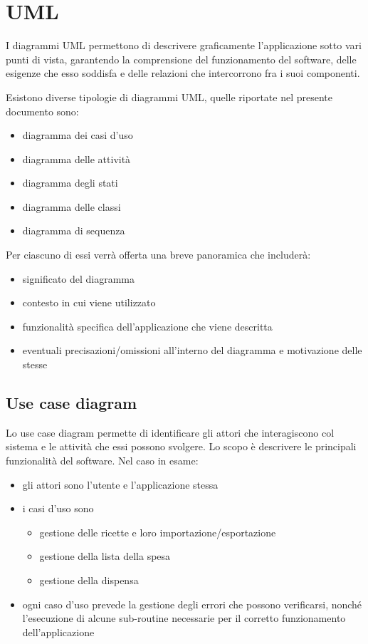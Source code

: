 \chapter{UML}

I diagrammi UML permettono di descrivere graficamente l'applicazione sotto vari punti di vista, garantendo la comprensione del funzionamento del software, delle esigenze che esso soddisfa e delle relazioni che intercorrono fra i suoi componenti.

Esistono diverse tipologie di diagrammi UML, quelle riportate nel presente documento sono:
\begin{itemize}
    \item diagramma dei casi d'uso
    \item diagramma delle attività
    \item diagramma degli stati
    \item diagramma delle classi
    \item diagramma di sequenza
\end{itemize}

Per ciascuno di essi verrà offerta una breve panoramica che includerà:
\begin{itemize}
    \item significato del diagramma 
    \item contesto in cui viene utilizzato
    \item funzionalità specifica dell'applicazione che viene descritta
    \item eventuali precisazioni/omissioni all'interno del diagramma e motivazione delle stesse
\end{itemize}

\newpage

\section{Use case diagram}

Lo use case diagram permette di identificare gli attori che interagiscono col sistema e le attività che essi possono svolgere. Lo scopo è descrivere le principali funzionalità del software.
Nel caso in esame:
\begin{itemize}
\item gli attori sono l'utente e l'applicazione stessa
\item i casi d'uso sono 
\begin{itemize}
\item gestione delle ricette e loro importazione/esportazione
\item gestione della lista della spesa
\item gestione della dispensa
\end{itemize}
\item ogni caso d'uso prevede la gestione degli errori che possono verificarsi, nonché l'esecuzione di alcune sub-routine necessarie per il corretto funzionamento dell'applicazione
\end{itemize}


